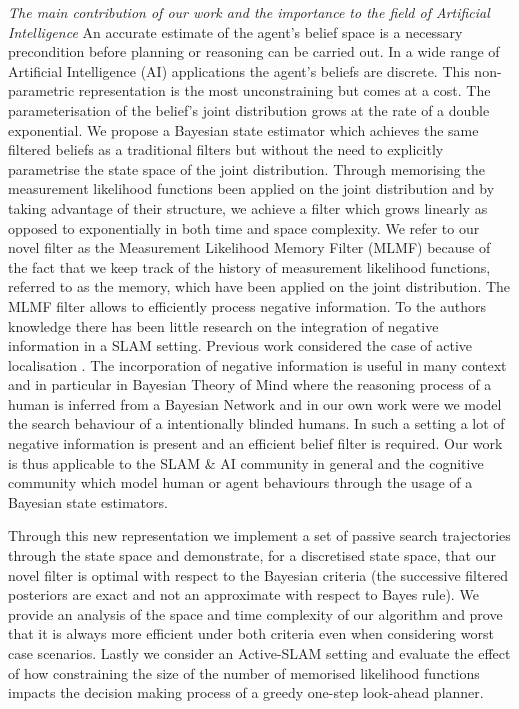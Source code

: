\textit{The main contribution of our work and the importance to the field of Artificial Intelligence} 
An accurate estimate of the agent's belief space is a necessary precondition before planning or reasoning can be carried out.
In a wide range of Artificial Intelligence (AI) applications the agent's beliefs are discrete. This non-parametric representation
is the most unconstraining but comes at a cost. The parameterisation of the belief's joint distribution grows at the rate of a double exponential.
We propose a Bayesian state estimator which achieves the same filtered beliefs as a traditional filters but without the need to explicitly parametrise the state space 
of the joint distribution. Through memorising the measurement likelihood functions been applied on the joint distribution 
and by taking advantage of their structure, we achieve a filter which grows linearly as opposed to exponentially 
in both time and space complexity. We refer to our novel filter as the Measurement Likelihood Memory Filter (MLMF) because
of the fact that we keep track of the history of measurement likelihood functions, referred to as the memory, which 
have been applied on the joint distribution.
The MLMF filter allows to efficiently process negative information. To the authors knowledge there has been little
research on the integration of negative information in a SLAM setting. Previous work considered the case of active localisation \cite{NegInfoFurtherStudies}.
The incorporation of negative information is useful in many context and in particular in Bayesian Theory of Mind \cite{Bake_Saxe_Tene_2011}
where the reasoning process of a human is inferred from a Bayesian Network and in our own work \cite{deChambrier2013} were we model the search behaviour of a intentionally blinded
humans. In such a setting a lot of negative information is present and an efficient belief filter is required. Our work is thus applicable to the SLAM \& AI community in general
and the cognitive community which model human or agent behaviours through the usage of a Bayesian state estimators.


Through this new representation we implement a set of passive search trajectories through the state 
space and demonstrate, for a discretised state space, that our novel filter is optimal with respect to the Bayesian criteria (the successive
filtered posteriors are exact and not an approximate with respect to Bayes rule). We provide an analysis of the space and time complexity of 
our algorithm and prove that it is always more efficient under both criteria even when considering worst case scenarios.
Lastly we consider an Active-SLAM setting and evaluate the effect of how constraining the size of the number of memorised likelihood 
functions impacts the decision making process of a greedy one-step look-ahead planner.

